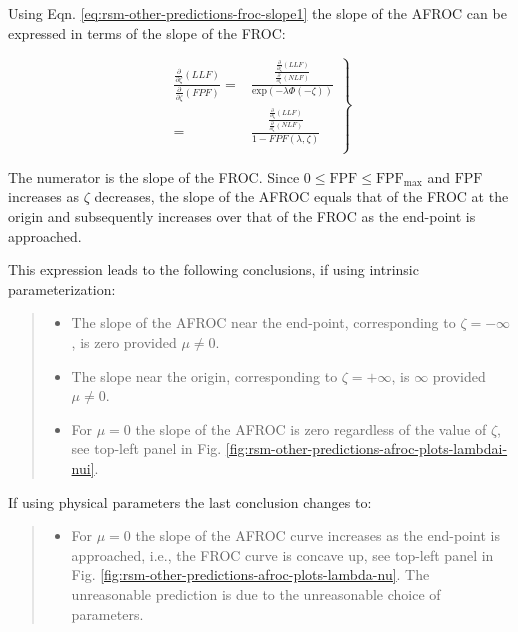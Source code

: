 \documentclass[
]{book}
\providecommand{\tightlist}{%
  \setlength{\itemsep}{0pt}\setlength{\parskip}{0pt}}
\begin{document}
Using Eqn. \eqref{eq:rsm-other-predictions-froc-slope1} the slope of the AFROC can be expressed in terms of the slope of the FROC:

\begin{equation}
\left. 
\begin{aligned}
\frac{\frac{\partial }{\partial \zeta}\left( LLF \right)}{\frac{\partial }{\partial \zeta}\left( FPF \right)} 
=& \frac{\frac{\frac{\partial }{\partial \zeta}\left( LLF \right)}{\frac{\partial }{\partial \zeta}\left( NLF \right)}}{\text{exp}\left ( -\lambda \Phi\left ( -\zeta \right )  \right )}\\ 
=& \frac{\frac{\frac{\partial }{\partial \zeta}\left( LLF \right)}{\frac{\partial }{\partial \zeta}\left( NLF \right)}}{1-FPF\left( \lambda, \zeta \right)}\\ 
\end{aligned}
\right \} 
\label{eq:rsm-other-predictions-afroc-slope3}
\end{equation}

The numerator is the slope of the FROC. Since \(0 \le \text{FPF} \le \text{FPF}_{\text{max}}\) and \(\text{FPF}\) increases as \(\zeta\) decreases, the slope of the AFROC equals that of the FROC at the origin and subsequently increases over that of the FROC as the end-point is approached.

This expression leads to the following conclusions, if using intrinsic parameterization:

\begin{quote}
\begin{itemize}
\tightlist
\item
  The slope of the AFROC near the end-point, corresponding to \(\zeta = -\infty\), is zero provided \(\mu \ne 0\).
\item
  The slope near the origin, corresponding to \(\zeta = +\infty\), is \(\infty\) provided \(\mu \ne 0\).
\item
  For \(\mu = 0\) the slope of the AFROC is zero regardless of the value of \(\zeta\), see top-left panel in Fig. \ref{fig:rsm-other-predictions-afroc-plots-lambdai-nui}.
\end{itemize}
\end{quote}

If using physical parameters the last conclusion changes to:

\begin{quote}
\begin{itemize}
\tightlist
\item
  For \(\mu = 0\) the slope of the AFROC curve increases as the end-point is approached, i.e., the FROC curve is concave up, see top-left panel in Fig. \ref{fig:rsm-other-predictions-afroc-plots-lambda-nu}. The unreasonable prediction is due to the unreasonable choice of parameters.
\end{itemize}
\end{quote}
\end{document}
